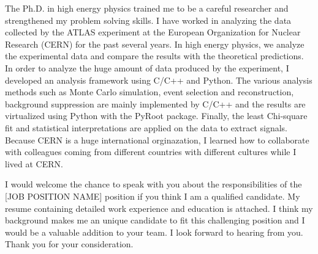 \documentclass[11pt,letterpaper]{moderncv}   %
\begin{document}
The Ph.D. in high energy physics trained me to be a careful researcher and strengthened my problem solving skills.
I have worked in analyzing the data collected by the ATLAS experiment at the European Organization for Nuclear Research (CERN) for the past several years.
In high energy physics, we analyze the experimental data and compare the results with the theoretical predictions.
In order to analyze the huge amount of data produced by the experiment, I developed an analysis framework using C/C++ and Python.
The various analysis methods such as Monte Carlo simulation, event selection and reconstruction, background suppression are mainly implemented by C/C++ and the results are virtualized using Python with the PyRoot package.
Finally, the least Chi-square fit and statistical interpretations are applied on the data to extract signals.
Because CERN is a huge international orginazation, I learned how to collaborate with colleagues coming from different countries with different cultures while I lived at CERN.


I would welcome the chance to speak with you about the responsibilities of the [JOB POSITION NAME] position if you think I am a qualified candidate.
My resume containing detailed work experience and education is attached.
I think my background makes me an unique candidate to fit this challenging position and I would be a valuable addition to your team.
I look forward to hearing from you.
Thank you for your consideration.


\vspace{0.01cm}

\makeletterclosing
\end{document}
